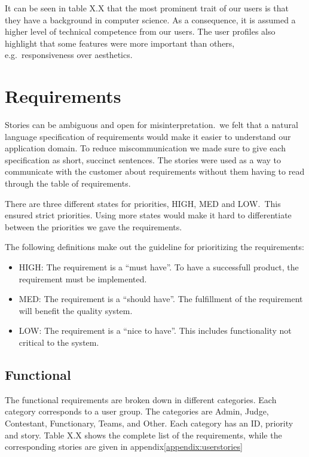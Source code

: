 It can be seen in table X.X that the most prominent trait of our users is that
they have a background in computer science. As a consequence, it is assumed a
higher level of technical competence from our users. The user profiles also
highlight that some features were more important than others, e.g.\
responsiveness over aesthetics.

\section{Requirements}
Stories can be ambiguous and open for misinterpretation.\
we felt that a natural language specification of requirements would make it
easier to understand our application domain. To reduce miscommunication we made
sure to give each specification as short, succinct sentences. The stories were
used as a way to communicate with the customer about requirements without them
having to read through the table of requirements.

There are three different states for priorities, HIGH, MED and LOW.\
This ensured strict priorities.
Using more states would make it hard to differentiate between the priorities we
gave the requirements.

The following definitions make out the guideline for
prioritizing the requirements:
\begin{itemize}
    \item HIGH: The requirement is a ``must have''. To have a successfull product,
        the requirement must be implemented.
    \item MED: The requirement is a ``should have''. The fulfillment of the
        requirement will benefit the quality system.
    \item LOW: The requirement is a ``nice to have''. This includes functionality
        not critical to the system.
\end{itemize}

\subsection{Functional}\label{section:functionalreq}
The functional requirements are broken down in different categories.
Each category corresponds to a user group. The categories are Admin, Judge,
Contestant, Functionary, Teams, and Other. Each category has an ID, priority
and story. Table X.X shows the complete list of the requirements, while the
corresponding stories are given in appendix\ref{appendix:userstories}

